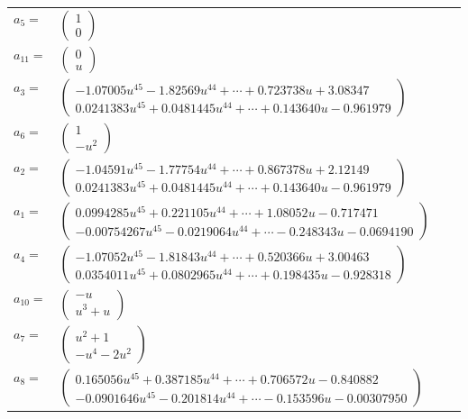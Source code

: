 \documentclass[1p]{elsarticle_modified}
\theoremstyle{definition}
\begin{document}
\begin{tabular}{m{7pt} m{180pt} m{7pt} m{180pt} }
\flushright $a_{5}=$&$\begin{pmatrix}1\\0\end{pmatrix}$ \\
\flushright $a_{11}=$&$\begin{pmatrix}0\\u\end{pmatrix}$ \\
\flushright $a_{3}=$&$\begin{pmatrix}-1.07005 u^{45}-1.82569 u^{44}+\cdots+0.723738 u+3.08347\\0.0241383 u^{45}+0.0481445 u^{44}+\cdots+0.143640 u-0.961979\end{pmatrix}$ \\
\flushright $a_{6}=$&$\begin{pmatrix}1\\- u^2\end{pmatrix}$ \\
\flushright $a_{2}=$&$\begin{pmatrix}-1.04591 u^{45}-1.77754 u^{44}+\cdots+0.867378 u+2.12149\\0.0241383 u^{45}+0.0481445 u^{44}+\cdots+0.143640 u-0.961979\end{pmatrix}$ \\
\flushright $a_{1}=$&$\begin{pmatrix}0.0994285 u^{45}+0.221105 u^{44}+\cdots+1.08052 u-0.717471\\-0.00754267 u^{45}-0.0219064 u^{44}+\cdots-0.248343 u-0.0694190\end{pmatrix}$ \\
\flushright $a_{4}=$&$\begin{pmatrix}-1.07052 u^{45}-1.81843 u^{44}+\cdots+0.520366 u+3.00463\\0.0354011 u^{45}+0.0802965 u^{44}+\cdots+0.198435 u-0.928318\end{pmatrix}$ \\
\flushright $a_{10}=$&$\begin{pmatrix}- u\\u^3+u\end{pmatrix}$ \\
\flushright $a_{7}=$&$\begin{pmatrix}u^2+1\\- u^4-2 u^2\end{pmatrix}$ \\
\flushright $a_{8}=$&$\begin{pmatrix}0.165056 u^{45}+0.387185 u^{44}+\cdots+0.706572 u-0.840882\\-0.0901646 u^{45}-0.201814 u^{44}+\cdots-0.153596 u-0.00307950\end{pmatrix}$ \\

\end{tabular}
\end{document}

